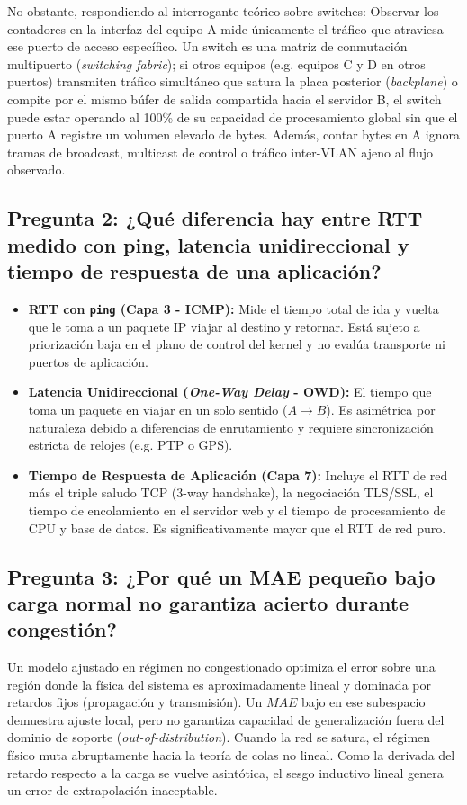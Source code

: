 \documentclass[10pt,twocolumn,letterpaper]{article}
\begin{document}
\noindent No obstante, respondiendo al interrogante teórico sobre switches: Observar los contadores en la interfaz del equipo A mide únicamente el tráfico que atraviesa ese puerto de acceso específico. Un switch es una matriz de conmutación multipuerto (\textit{switching fabric}); si otros equipos (e.g. equipos C y D en otros puertos) transmiten tráfico simultáneo que satura la placa posterior (\textit{backplane}) o compite por el mismo búfer de salida compartida hacia el servidor B, el switch puede estar operando al 100\% de su capacidad de procesamiento global sin que el puerto A registre un volumen elevado de bytes. Además, contar bytes en A ignora tramas de broadcast, multicast de control o tráfico inter-VLAN ajeno al flujo observado.

\subsection{Pregunta 2: ¿Qué diferencia hay entre RTT medido con ping, latencia unidireccional y tiempo de respuesta de una aplicación?}
\begin{itemize}
    \item \textbf{RTT con \texttt{ping} (Capa 3 - ICMP):} Mide el tiempo total de ida y vuelta que le toma a un paquete IP viajar al destino y retornar. Está sujeto a priorización baja en el plano de control del kernel y no evalúa transporte ni puertos de aplicación.
    \item \textbf{Latencia Unidireccional (\textit{One-Way Delay} - OWD):} El tiempo que toma un paquete en viajar en un solo sentido ($A \to B$). Es asimétrica por naturaleza debido a diferencias de enrutamiento y requiere sincronización estricta de relojes (e.g. PTP o GPS).
    \item \textbf{Tiempo de Respuesta de Aplicación (Capa 7):} Incluye el RTT de red más el triple saludo TCP (3-way handshake), la negociación TLS/SSL, el tiempo de encolamiento en el servidor web y el tiempo de procesamiento de CPU y base de datos. Es significativamente mayor que el RTT de red puro.
\end{itemize}

\subsection{Pregunta 3: ¿Por qué un MAE pequeño bajo carga normal no garantiza acierto durante congestión?}
Un modelo ajustado en régimen no congestionado optimiza el error sobre una región donde la física del sistema es aproximadamente lineal y dominada por retardos fijos (propagación y transmisión). Un $MAE$ bajo en ese subespacio demuestra ajuste local, pero no garantiza capacidad de generalización fuera del dominio de soporte (\textit{out-of-distribution}). Cuando la red se satura, el régimen físico muta abruptamente hacia la teoría de colas no lineal. Como la derivada del retardo respecto a la carga se vuelve asintótica, el sesgo inductivo lineal genera un error de extrapolación inaceptable.
\end{document}
